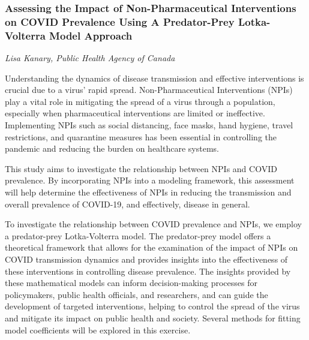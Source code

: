 \subsubsection*{Assessing the Impact of Non-Pharmaceutical Interventions on COVID Prevalence Using A Predator-Prey Lotka-Volterra Model Approach}
\textit{Lisa Kanary, Public Health Agency of Canada}

Understanding the dynamics of disease transmission and effective
interventions is crucial due to a virus' rapid
spread. Non-Pharmaceutical Interventions (NPIs) play a vital role in
mitigating the spread of a virus through a population, especially when
pharmaceutical interventions are limited or ineffective.  Implementing
NPIs such as social distancing, face masks, hand hygiene, travel
restrictions, and quarantine measures has been essential in
controlling the pandemic and reducing the burden on healthcare
systems.

This study aims to investigate the relationship between NPIs and COVID
prevalence. By incorporating NPIs into a modeling framework, this
assessment will help determine the effectiveness of NPIs in reducing
the transmission and overall prevalence of COVID-19, and effectively,
disease in general.

To investigate the relationship between COVID prevalence and NPIs, we
employ a predator-prey Lotka-Volterra model. The predator-prey model
offers a theoretical framework that allows for the examination of the
impact of NPIs on COVID transmission dynamics and provides insights
into the effectiveness of these interventions in controlling disease
prevalence. The insights provided by these mathematical models can
inform decision-making processes for policymakers, public health
officials, and researchers, and can guide the development of targeted
interventions, helping to control the spread of the virus and mitigate
its impact on public health and society. Several methods for fitting
model coefficients will be explored in this exercise.

